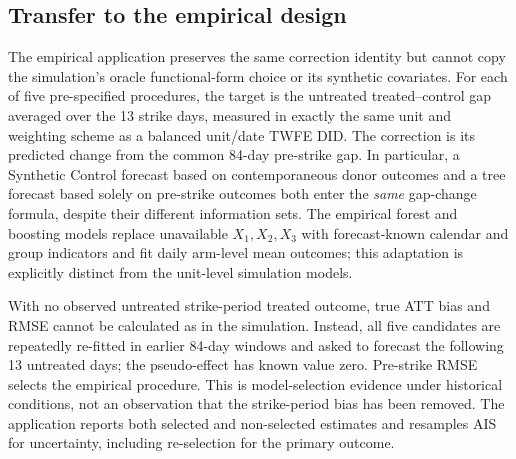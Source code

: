 \documentclass[11pt,a4paper]{article}
\begin{document}
\subsection{Transfer to the empirical design}
The empirical application preserves the same correction identity but cannot copy the simulation's oracle functional-form choice or its synthetic covariates. For each of five pre-specified procedures, the target is the untreated treated--control gap averaged over the 13 strike days, measured in exactly the same unit and weighting scheme as a balanced unit/date TWFE DID. The correction is its predicted change from the common 84-day pre-strike gap. In particular, a Synthetic Control forecast based on contemporaneous donor outcomes and a tree forecast based solely on pre-strike outcomes both enter the \emph{same} gap-change formula, despite their different information sets. The empirical forest and boosting models replace unavailable $X_1,X_2,X_3$ with forecast-known calendar and group indicators and fit daily arm-level mean outcomes; this adaptation is explicitly distinct from the unit-level simulation models.

With no observed untreated strike-period treated outcome, true ATT bias and RMSE cannot be calculated as in the simulation. Instead, all five candidates are repeatedly re-fitted in earlier 84-day windows and asked to forecast the following 13 untreated days; the pseudo-effect has known value zero. Pre-strike RMSE selects the empirical procedure. This is model-selection evidence under historical conditions, not an observation that the strike-period bias has been removed. The application reports both selected and non-selected estimates and resamples AIS for uncertainty, including re-selection for the primary outcome.
\end{document}
